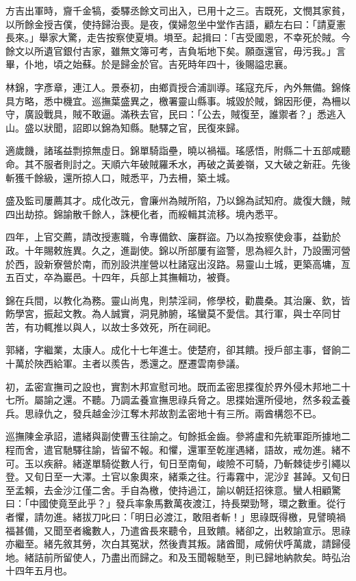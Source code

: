 \begin{pinyinscope}
方吉出軍時，齎千金犒，委驛丞餘文司出入，已用十之三。吉既死，文憫其家貧，以所餘金授吉僕，使持歸治喪。是夜，僕婦忽坐中堂作吉語，顧左右曰：「請夏憲長來。」舉家大驚，走告按察使夏塤。塤至。起揖曰：「吉受國恩，不幸死於賊。今餘文以所遺官銀付吉家，雖無文簿可考，吉負垢地下矣。願亟還官，毋污我。」言畢，仆地，頃之始蘇。於是歸金於官。吉死時年四十，後賜謚忠襄。

林錦，字彥章，連江人。景泰初，由鄉貢授合浦訓導。瑤寇充斥，內外無備。錦條具方略，悉中機宜。巡撫葉盛異之，檄署靈山縣事。城毀於賊，錦因形便，為柵以守，廣設戰具，賊不敢逼。滿秩去官，民曰：「公去，賊復至，誰禦者？」悉逃入山。盛以狀聞，詔即以錦為知縣。馳驛之官，民復來歸。

適歲饑，諸瑤益剽掠無虛日。錦單騎詣壘，曉以禍福。瑤感悟，附縣二十五部咸聽命。其不服者則討之。天順六年破賊羅禾水，再破之黃姜嶺，又大破之新莊。先後斬獲千餘級，還所掠人口，賊悉平，乃去柵，築土城。

盛及監司屢薦其才。成化改元，會廉州為賊所陷，乃以錦為試知府。歲復大饑，賊四出劫掠。錦諭散千餘人，誅梗化者，而綏輯其流移。境內悉平。

四年，上官交薦，請改授憲職，令專備欽、廉群盜。乃以為按察使僉事，益勤於政。十年賜敕旌異。久之，進副使。錦以所部屢有盜警，思為經久計，乃設團河營於西，設新寮營於南，而別設洪崖營以杜諸寇出沒路。易靈山土城，更築高墉，亙五百丈，卒為巖邑。十四年，兵部上其撫輯功，被賚。

錦在兵間，以教化為務。靈山尚鬼，則禁淫祠，修學校，勸農桑。其治廉、欽，皆飭學宮，振起文教。為人誠實，洞見肺腑，瑤蠻莫不愛信。其行軍，與士卒同甘苦，有功輒推以與人，以故士多效死，所在祠祀。

郭緒，字繼業，太康人。成化十七年進士。使楚府，卻其饋。授戶部主事，督餉二十萬於陜西給軍。主者以羨告，悉還之。歷遷雲南參議。

初，孟密宣撫司之設也，實割木邦宣慰司地。既而孟密思揲復於界外侵木邦地二十七所。屬諭之還。不聽。乃調孟養宣撫思祿兵脅之。思揲始還所侵地，然多殺孟養兵。思祿仇之，發兵越金沙江奪木邦故割孟密地十有三所。兩酋構怨不已。

巡撫陳金承詔，遣緒與副使曹玉往諭之。旬餘抵金齒。參將盧和先統軍距所據地二程而舍，遣官馳驛往諭，皆留不報。和懼，還軍至乾崖遇緒，語故，戒勿進。緒不可。玉以疾辭。緒遂單騎從數人行，旬日至南甸，峻險不可騎，乃斬棘徒步引繩以登。又旬日至一大澤。土官以象輿來，緒乘之往。行毒霧中，泥沙𧾷甚踔。又旬日至孟賴，去金沙江僅二舍。手自為檄，使持過江，諭以朝廷招徠意。蠻人相顧驚曰：「中國使竟至此乎？」發兵率象馬數萬夜渡江，持長槊勁弩，環之數重。從行者懼，請勿進。緒拔刀叱曰：「明日必渡江，敢阻者斬！」思祿既得檄，見譬曉禍福甚備，又聞至者纔數人，乃遣酋長來聽令，且致饋。緒卻之，出敕諭宣示。思祿亦繼至。緒先敘其勞，次白其冤狀，然後責其叛。諸酋聞，咸俯伏呼萬歲，請歸侵地。緒詰前所留使人，乃盡出而歸之。和及玉聞報馳至，則已歸地納款矣。時弘治十四年五月也。


\end{pinyinscope}
